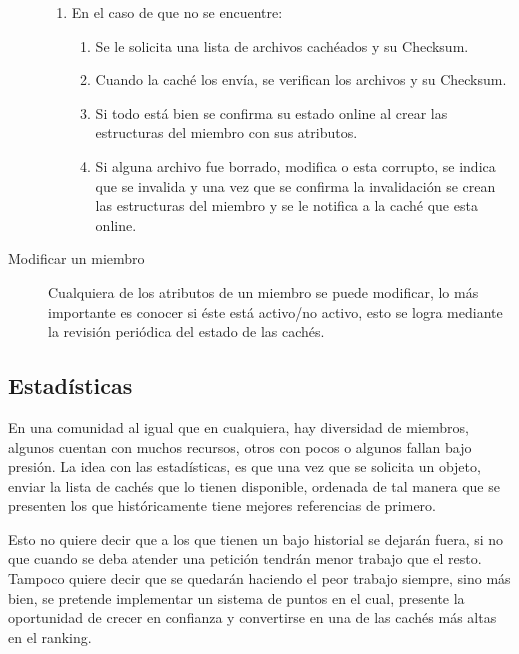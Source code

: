 \begin{description}
\begin{enumerate}
	\item En el caso de que no se encuentre:
		\begin{enumerate}
		\item Se le solicita una lista de archivos cachéados y su Checksum.
		\item Cuando la caché los envía, se verifican los archivos y su Checksum.
		\item Si todo está bien se confirma su estado online al crear las estructuras del miembro con sus atributos.
		\item Si alguna archivo fue borrado, modifica o esta corrupto, se indica que se invalida y una vez que se confirma la invalidación se crean las estructuras del miembro y se le notifica a la caché que esta online.
		\end{enumerate}	
	
	\end{enumerate}
	
\item [Modificar un miembro] Cualquiera de los atributos de un miembro se puede modificar, lo más importante es conocer si éste está activo/no activo, esto se logra mediante la  revisión periódica del estado de las cachés.

\end{description}


\subsection{Estadísticas}

En una comunidad al igual que en cualquiera, hay diversidad de miembros, algunos cuentan con muchos recursos, otros con pocos o algunos fallan bajo presión. La idea con las estadísticas, es que una vez que se solicita un objeto, enviar la lista de cachés que lo tienen disponible, ordenada de tal manera que se presenten los que históricamente tiene mejores referencias de primero. 

Esto no quiere decir que a los que tienen un bajo historial se dejarán fuera, si no que cuando se deba atender una petición tendrán menor trabajo que el resto. Tampoco quiere decir que se quedarán haciendo el peor trabajo siempre, sino más bien, se pretende implementar un sistema de puntos en el cual, presente la oportunidad de crecer en confianza y convertirse en una de las cachés más altas en el ranking.

